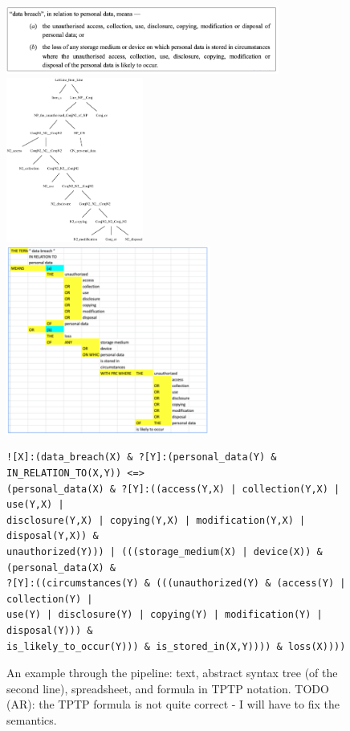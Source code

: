 \documentclass{IOS-Book-Article}
\begin{document}
\begin{figure}
\includegraphics[width=0.8\textwidth]{text.png}
\includegraphics[width=0.4\textwidth]{tree.eps}
\includegraphics[width=0.6\textwidth]{assembly.png}
\small
\begin{verbatim}
![X]:(data_breach(X) & ?[Y]:(personal_data(Y) & IN_RELATION_TO(X,Y)) <=>
(personal_data(X) & ?[Y]:((access(Y,X) | collection(Y,X) | use(Y,X) |
disclosure(Y,X) | copying(Y,X) | modification(Y,X) | disposal(Y,X)) &
unauthorized(Y))) | (((storage_medium(X) | device(X)) & (personal_data(X) &
?[Y]:((circumstances(Y) & (((unauthorized(Y) & (access(Y) | collection(Y) |
use(Y) | disclosure(Y) | copying(Y) | modification(Y) | disposal(Y))) &
is_likely_to_occur(Y))) & is_stored_in(X,Y)))) & loss(X))))
\end{verbatim}
\normalsize
\caption{An example through the pipeline: text, abstract syntax tree (of the second line), spreadsheet, and formula in TPTP notation.
TODO (AR): the TPTP formula is not quite correct - I will have to fix the semantics.
}
\label{pipeline-ex}
\end{figure}
\end{document}
